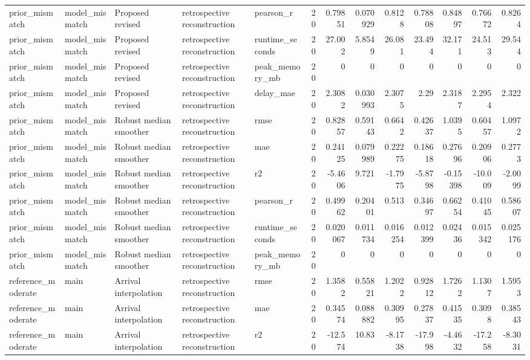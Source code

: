 \begin{table}[!htbp]
{{\begin{tabular}{lllllrrrrrrrr}
prior_mismatch & model_mismatch & Proposed revised & retrospective reconstruction & pearson_r & 20 & 0.79851 & 0.070929 & 0.8128 & 0.78808 & 0.84897 & 0.76672 & 0.8264 \\
prior_mismatch & model_mismatch & Proposed revised & retrospective reconstruction & runtime_seconds & 20 & 27.002 & 5.8549 & 26.081 & 23.494 & 32.171 & 24.513 & 29.544 \\
prior_mismatch & model_mismatch & Proposed revised & retrospective reconstruction & peak_memory_mb & 20 & 0 & 0 & 0 & 0 & 0 & 0 & 0 \\
prior_mismatch & model_mismatch & Proposed revised & retrospective reconstruction & delay_mae & 20 & 2.3082 & 0.030993 & 2.3075 & 2.29 & 2.3187 & 2.2954 & 2.322 \\
prior_mismatch & model_mismatch & Robust median smoother & retrospective reconstruction & rmse & 20 & 0.82857 & 0.59143 & 0.6642 & 0.42637 & 1.0395 & 0.60457 & 1.0972 \\
prior_mismatch & model_mismatch & Robust median smoother & retrospective reconstruction & mae & 20 & 0.24125 & 0.079989 & 0.22275 & 0.18618 & 0.27696 & 0.20906 & 0.2773 \\
prior_mismatch & model_mismatch & Robust median smoother & retrospective reconstruction & r2 & 20 & -5.4606 & 9.721 & -1.7975 & -5.8798 & -0.15398 & -10.009 & -2.0099 \\
prior_mismatch & model_mismatch & Robust median smoother & retrospective reconstruction & pearson_r & 20 & 0.49962 & 0.20401 & 0.513 & 0.34697 & 0.66254 & 0.41045 & 0.58607 \\
prior_mismatch & model_mismatch & Robust median smoother & retrospective reconstruction & runtime_seconds & 20 & 0.020067 & 0.011734 & 0.016254 & 0.012399 & 0.02436 & 0.015342 & 0.025176 \\
prior_mismatch & model_mismatch & Robust median smoother & retrospective reconstruction & peak_memory_mb & 20 & 0 & 0 & 0 & 0 & 0 & 0 & 0 \\
reference_moderate & main & Arrival interpolation & retrospective reconstruction & rmse & 20 & 1.3582 & 0.55821 & 1.2022 & 0.92812 & 1.7262 & 1.1307 & 1.5953 \\
reference_moderate & main & Arrival interpolation & retrospective reconstruction & mae & 20 & 0.34574 & 0.088882 & 0.30995 & 0.27837 & 0.41535 & 0.3098 & 0.38543 \\
reference_moderate & main & Arrival interpolation & retrospective reconstruction & r2 & 20 & -12.574 & 10.83 & -8.1738 & -17.998 & -4.4632 & -17.258 & -8.3031 \\

\end{tabular}}}
\end{table}
